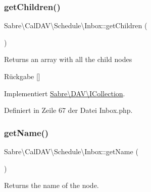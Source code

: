 \mbox{\label{class_sabre_1_1_cal_d_a_v_1_1_schedule_1_1_inbox_afd7af5894f052f0a2eb86455065fe495}} 
\subsubsection{\texorpdfstring{get\+Children()}{getChildren()}}
{\footnotesize\ttfamily Sabre\textbackslash{}\+Cal\+D\+A\+V\textbackslash{}\+Schedule\textbackslash{}\+Inbox\+::get\+Children (\begin{DoxyParamCaption}{ }\end{DoxyParamCaption})}

Returns an array with all the child nodes

\begin{DoxyReturn}{Rückgabe}
\mbox{[}\mbox{]} 
\end{DoxyReturn}


Implementiert \mbox{\hyperlink{interface_sabre_1_1_d_a_v_1_1_i_collection_a5344a6890e49fd7a81bb0e38b4c6d0be}{Sabre\textbackslash{}\+D\+A\+V\textbackslash{}\+I\+Collection}}.



Definiert in Zeile 67 der Datei Inbox.\+php.

\mbox{\label{class_sabre_1_1_cal_d_a_v_1_1_schedule_1_1_inbox_a17cc7b8dc7473e91f76d807d42562cf5}} 
\subsubsection{\texorpdfstring{get\+Name()}{getName()}}
{\footnotesize\ttfamily Sabre\textbackslash{}\+Cal\+D\+A\+V\textbackslash{}\+Schedule\textbackslash{}\+Inbox\+::get\+Name (\begin{DoxyParamCaption}{ }\end{DoxyParamCaption})}

Returns the name of the node.

